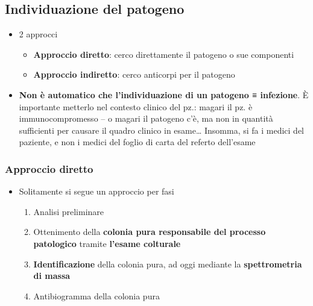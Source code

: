 \documentclass[italian,]{article}
\providecommand{\tightlist}{%
  \setlength{\itemsep}{0pt}\setlength{\parskip}{0pt}}
\begin{document}
\hypertarget{individuazione-del-patogeno}{%
\subsection{Individuazione del
patogeno}\label{individuazione-del-patogeno}}

\begin{itemize}
\tightlist
\item
  2 approcci

  \begin{itemize}
  \tightlist
  \item
    \textbf{Approccio diretto}: cerco direttamente il patogeno o sue
    componenti
  \item
    \textbf{Approccio indiretto}: cerco anticorpi per il patogeno
  \end{itemize}
\item
  \textbf{Non è automatico che l'individuazione di un patogeno ≡
  infezione}. È importante metterlo nel contesto clinico del pz.: magari
  il pz. è immunocompromesso -- o magari il patogeno c'è, ma non in
  quantità sufficienti per causare il quadro clinico in esame\ldots{}
  Insomma, si fa i medici del paziente, e non i medici del foglio di
  carta del referto dell'esame
\end{itemize}

\hypertarget{approccio-diretto}{%
\subsubsection{Approccio diretto}\label{approccio-diretto}}

\begin{itemize}
\tightlist
\item
  Solitamente si segue un approccio per fasi

  \begin{enumerate}
  \def\labelenumi{\arabic{enumi}.}
  \tightlist
  \item
    Analisi preliminare
  \item
    Ottenimento della \textbf{colonia pura responsabile del processo
    patologico} tramite \textbf{l'esame colturale}
  \item
    \textbf{Identificazione} della colonia pura, ad oggi mediante la
    \textbf{spettrometria di massa}
  \item
    Antibiogramma della colonia pura
  \end{enumerate}
\end{itemize}
\end{document}
